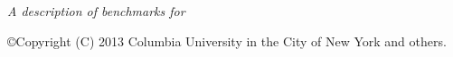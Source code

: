 \documentclass[10pt,twoside,openright]{memoir}
\begin{document}
\pagestyle{headings}
\let\cleardoublepage\clearpage
\maketitle
\frontmatter

\null\vfill

\begin{flushleft}
\textit{A description of benchmarks for \TF}


\copyright{Copyright (C) 2013 Columbia University in the City of New York and others.}












\end{flushleft}
\let\cleardoublepage\clearpage

\newpage
\tableofcontents*
\mainmatter
\sloppy










\end{document}
